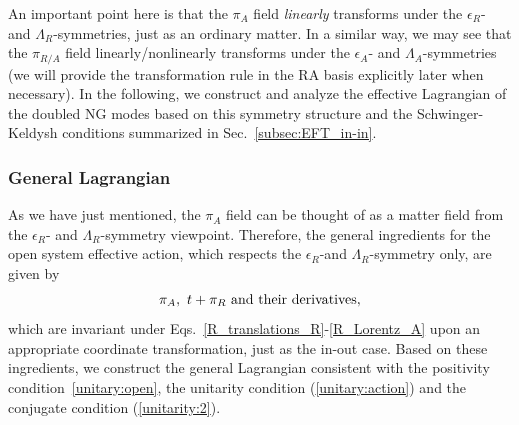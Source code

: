 \documentclass[a4paper,11pt]{article}
\begin{document}
An important point here is that the $\pi_A$ field {\it linearly} transforms under the $\epsilon_R$- and $\Lambda_R$-symmetries, just as an ordinary matter. 
In a similar way, we may see that the $\pi_{R/A}$ field linearly/nonlinearly transforms under the $\epsilon_A$- and $\Lambda_A$-symmetries (we will provide the transformation rule in the RA basis explicitly later when necessary).
In the following, we construct and analyze the effective Lagrangian of the doubled NG modes based on this symmetry structure and the Schwinger-Keldysh conditions summarized in Sec.~\ref{subsec:EFT_in-in}.

\subsubsection{General Lagrangian}

As we have just mentioned, the $\pi_A$ field can be thought of as a matter field from the $\epsilon_R$- and $\Lambda_R$-symmetry viewpoint. Therefore, the general ingredients for the open system effective action, which respects the $\epsilon_R$-and $\Lambda_R$-symmetry only, are given by
\begin{align}
\pi_{A},~t+\pi_{R} {\rm ~and~their~derivatives},
\label{ingredients}
\end{align}
which are invariant under Eqs.~\eqref{R_translations_R}-\eqref{R_Lorentz_A} upon an appropriate coordinate transformation, just as the in-out case. Based on these ingredients, we construct the general Lagrangian consistent with the positivity condition~\eqref{unitary:open}, the unitarity condition (\ref{unitary:action}) and the conjugate condition (\ref{unitarity:2}).
\end{document}
